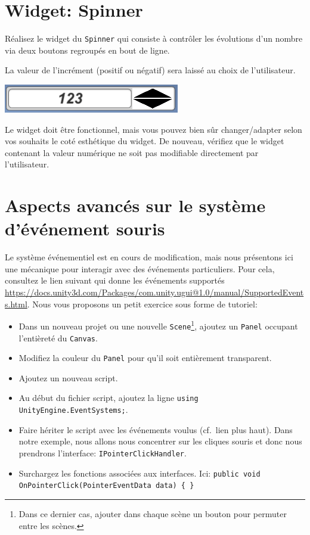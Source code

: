 \documentclass[a4paper,10pt]{article}
\begin{document}
\section{Widget: Spinner}

Réalisez le widget du \texttt{Spinner} qui consiste à contrôler les évolutions d'un nombre via deux boutons regroupés en bout de ligne. 

La valeur de l'incrément (positif ou négatif) sera laissé au choix de l'utilisateur. 

\begin{center}
	\includegraphics[width=0.6\linewidth]{rc/ui_spinner_layout}
\end{center}

Le widget doit être fonctionnel, mais vous pouvez bien sûr changer/adapter selon vos souhaits le coté esthétique du widget.
De nouveau, vérifiez que le widget contenant la valeur numérique ne soit pas modifiable directement par l'utilisateur.

\section{Aspects avancés sur le système d'événement souris}

Le système événementiel est en cours de modification, mais nous présentons ici une mécanique pour interagir avec des événements particuliers. Pour cela, consultez le lien suivant qui donne les événements supportés \url{https://docs.unity3d.com/Packages/com.unity.ugui@1.0/manual/SupportedEvents.html}. Nous vous proposons un petit exercice sous forme de tutoriel:
\begin{itemize}
	\item Dans un nouveau projet ou une nouvelle \texttt{Scene}\footnote{Dans ce dernier cas, ajouter dans chaque scène un bouton pour permuter entre les scènes.}, ajoutez un \texttt{Panel} occupant l'entièreté du \texttt{Canvas}.
	\item Modifiez la couleur du \texttt{Panel} pour qu'il soit entièrement transparent.
	\item Ajoutez un nouveau script.
	\item Au début du fichier script, ajoutez la ligne \lstinline|using UnityEngine.EventSystems;|.
	\item Faire hériter le script avec les événements voulus (cf.~lien plus haut). Dans notre exemple, nous allons nous concentrer sur les cliques souris et donc nous prendrons l'interface: \texttt{IPointerClickHandler}.
	\item Surchargez les fonctions associées aux interfaces. Ici: \lstinline|public void OnPointerClick(PointerEventData data) { }|
\end{itemize}
\end{document}
